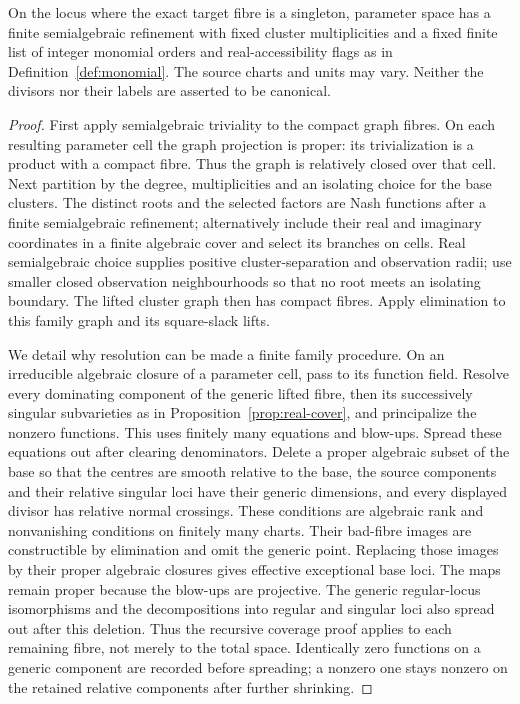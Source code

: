 \begin{lemma}\label{lem:relative}
On the locus where the exact target fibre is a singleton, parameter space
has a finite semialgebraic refinement with fixed cluster multiplicities
and a fixed finite list of integer monomial orders and real-accessibility
flags as in Definition~\ref{def:monomial}. The source charts and units may
vary. Neither the divisors nor their labels are asserted to be canonical.
\end{lemma}
\begin{proof}
First apply semialgebraic triviality to the compact graph fibres. On
each resulting parameter cell the graph projection is proper: its
trivialization is a product with a compact fibre. Thus the graph is
relatively closed over that cell. Next partition by the degree,
multiplicities and an isolating choice for the base clusters. The distinct roots and the selected factors are Nash
functions after a finite semialgebraic refinement; alternatively include
their real and imaginary coordinates in a finite algebraic cover and
select its branches on cells. Real semialgebraic choice supplies positive
cluster-separation and observation radii; use smaller closed observation
neighbourhoods so that no root meets an isolating boundary. The lifted
cluster graph then has compact fibres. Apply elimination to this family
graph and its square-slack lifts.

We detail why resolution can be made a finite family procedure. On an
irreducible algebraic closure of a parameter cell, pass to its function
field. Resolve every dominating component of the generic lifted fibre,
then its successively singular subvarieties as in
Proposition~\ref{prop:real-cover}, and principalize the nonzero functions.
This uses finitely many equations and blow-ups. Spread these equations
out after clearing denominators. Delete a proper algebraic subset of the
base so that the centres are smooth relative to the base, the source
components and their relative singular loci have their generic
dimensions, and every displayed divisor has relative normal crossings.
These conditions are algebraic rank and nonvanishing conditions on
finitely many charts. Their bad-fibre images are constructible by
elimination and omit the generic point. Replacing those images by
their proper algebraic closures gives effective exceptional base loci. The maps remain proper because the blow-ups are
projective. The generic regular-locus isomorphisms and the decompositions
into regular and singular loci also spread out after this deletion.
Thus the recursive coverage proof applies to each remaining fibre, not
merely to the total space. Identically zero functions on a generic
component are recorded before spreading; a nonzero one stays nonzero
on the retained relative components after further shrinking.


\end{proof}
